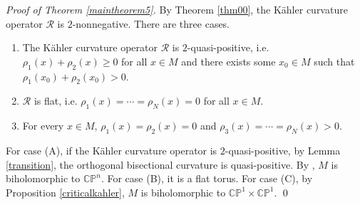 \documentclass[12pt]{amsart}
\theoremstyle{plain}
\newtheorem{cor}[thm]{Corollary}
\theoremstyle{definition}
\newcommand{\bcorollary}{\begin{cor}}
\newcommand{\ecorollary}{\end{cor}}
\newcommand{\beq}{\begin{equation}}
\newcommand{\eeq}{\end{equation}}
\newcommand{\bd}{\begin{enumerate}}
\newcommand{\ed}{\end{enumerate}}
\renewcommand{\>}{\rightarrow}
\newcommand{\C}{{\mathbb C}}
\renewcommand{\P}{{\mathbb P}}
\numberwithin{equation}{section} %
\begin{document}
	
	\baselineskip 
	
	
	\noindent\emph{Proof of Theorem \ref{maintheorem5}.} By Theorem \ref{thm00},  the K\"ahler curvature operator $\mathscr R$ is $2$-nonnegative. There are three cases.
	
	\bd \item[(A)] The K\"ahler curvature operator $\mathscr R$ is $2$-quasi-positive, i.e.   $\rho_{1}(x)+\rho_{2}(x)\geq 0$ for all $x\in M$ and there exists some $x_0\in M$ such that $\rho_{1}(x_0)+\rho_{2}(x_0)>0$.
	\item[(B)] $\mathscr R$ is flat, i.e. $\rho_1(x)=\cdots =\rho_N(x)=0$ for all $x\in M$.
	
	\item[(C)] For every $x\in M$,  $\rho_1(x)=\rho_2(x)=0$ and $\rho_3(x)=\cdots =\rho_N(x)>0$.
	\ed 	
For case (A), if the K\"ahler curvature operator is $2$-quasi-positive, by Lemma \ref{transition},  the orthogonal  bisectional curvature is quasi-positive.  By \cite{GuZhang2010},  $M$ is biholomorphic to $\C\P^n$. For case (B), it is a flat torus. For case (C), by Proposition \ref{criticalkahler}, $M$ is biholomorphic to $\C\P^1\times \C\P^1$.	\qed
	
	
	
	
	
	
	\baselineskip
	
\end{document}
